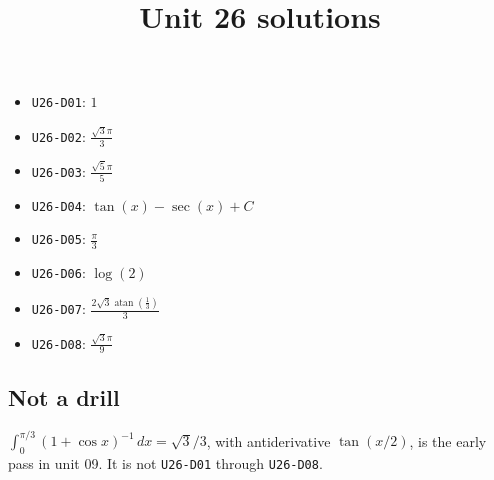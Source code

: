 \title{Unit 26 solutions}\maketitle\begin{itemize}
  \item \texttt{U26-D01}: $1$
  \item \texttt{U26-D02}: $\frac{\sqrt{3} \pi}{3}$
  \item \texttt{U26-D03}: $\frac{\sqrt{5} \pi}{5}$
  \item \texttt{U26-D04}: $\tan{\left(x \right)} - \sec{\left(x \right)}+C$
  \item \texttt{U26-D05}: $\frac{\pi}{3}$
  \item \texttt{U26-D06}: $\log{\left(2 \right)}$
  \item \texttt{U26-D07}: $\frac{2 \sqrt{3} \operatorname{atan}{\left(\frac{1}{3} \right)}}{3}$
  \item \texttt{U26-D08}: $\frac{\sqrt{3} \pi}{9}$
\end{itemize}
\subsection*{Not a drill}
$\int_0^{\pi/3}(1+\cos x)^{-1}\,dx=\sqrt{3}/3$, with antiderivative $\tan(x/2)$, is the early pass in unit 09. It is not \texttt{U26-D01} through \texttt{U26-D08}.

